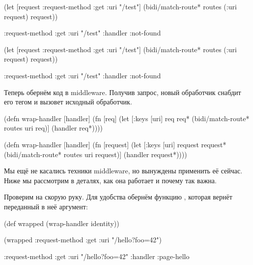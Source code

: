 \ifnarrow

\begin{clojure}
(let [request {:request-method :get
               :uri "/test"}]
  (bidi/match-route*
    routes (:uri request) request))

{:request-method :get
 :uri "/test"
 :handler :not-found}
\end{clojure}

\else

\begin{clojure}
(let [request {:request-method :get
               :uri "/test"}]
  (bidi/match-route* routes (:uri request) request))

{:request-method :get
 :uri "/test"
 :handler :not-found}
\end{clojure}

\fi

Теперь обернём код в middleware. Получив запрос, новый обработчик снабдит его
тегом и вызовет исходный обработчик.

\label{wrap-handler}

\ifnarrow

\begin{clojure}
(defn wrap-handler [handler]
  (fn [req]
    (let [{:keys [uri]} req
           req* (bidi/match-route*
                  routes uri req)]
      (handler req*))))
\end{clojure}

\else

\begin{clojure}
(defn wrap-handler [handler]
  (fn [request]
    (let [{:keys [uri]} request
          request* (bidi/match-route* routes uri request)]
      (handler request*))))
\end{clojure}

\fi

Мы ещё не касались техники middleware, но вынуждены применить её сейчас. Ниже мы
рассмотрим в деталях, как она работает и почему так важна.

Проверим  на скорую руку. Для удобства обернём функцию
, которая вернёт переданный в неё аргумент:

\begin{clojure}
(def wrapped (wrap-handler identity))

(wrapped {:request-method :get
          :uri "/hello?foo=42"})

{:request-method :get
 :uri "/hello?foo=42"
 :handler :page-hello}
\end{clojure}

